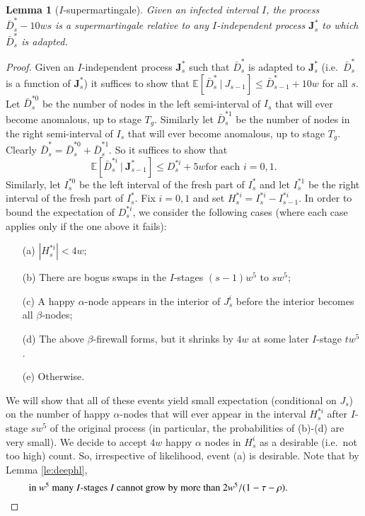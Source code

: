 \documentclass[11pt]{article}
\theoremstyle{plain}
\newtheorem{lem}[thm]{Lemma}
\numberwithin{equation}{subsection}
\newcommand{\JJ}{\mathbf{J}}
\DeclareRobustCommand{\expec}[3][{\mbox{$\mathbb{E}$}}]{\ensuremath {#1}\left[ {#2} \ \big|\  {#3} \right]}
\begin{document}
\begin{lem}[$I$-supermartingale]\label{le:atomdma}
Given an infected interval $I$, the process
$\bar{D}_{s}^{\ast}-10ws$ is a supermartingale
relative to any $I$-independent process $\JJ^{\ast}_s$ to which  $\bar{D}_{s}^{\ast}$ is adapted.
\end{lem}
\begin{proof}
Given an $I$-independent process $\JJ^{\ast}_s$ such that 
$\bar{D}_{s}^{\ast}$ is adapted to $\JJ^{\ast}_s$
(i.e.\ $\bar{D}_{s}^{\ast}$ is a function of $\JJ^{\ast}_s$) 
it suffices to show that $\expec{\bar{D}_{s}^{\ast}}{J_{s-1}}\leq \bar{D}_{s-1}^{\ast} +10w$
for all $s$.
Let $\bar{D}_{s}^{\ast 0}$ be the number of nodes in the left semi-interval of $I_s$ 
that will ever become anomalous, up to stage $T_g$. Similarly let
$\bar{D}_{s}^{\ast 1}$ be the number of nodes in the right semi-interval of $I_s$ 
that will ever become anomalous, up to stage $T_g$. Clearly 
$\bar{D}_{s}^{\ast}=\bar{D}_{s}^{\ast 0}+\bar{D}_{s}^{\ast 1}$. So it suffices to show that
\[
\textrm{$\expec{\bar{D}_{s}^{\ast i}}{\JJ^{\ast}_{s-1}}\leq D_{s}^{\ast i} +5w$
 for each $i=0,1$.}
\]
 Similarly, let $I^{\ast 0}_s$ be the left interval of the fresh part of $I_s^{\ast}$
 and let $I^{\ast 1}_s$ be the right interval of the fresh part of $I_s^{\ast}$.
 Fix $i=0,1$ and
 set $H^{\ast i}_{s}=I^{\ast i}_{s}-I^{\ast i}_{s-1}$.
In order to bound the expectation of $D^{\ast i}_s$, we consider the following cases 
(where each case applies only if the one above it fails):
\begin{enumerate}
\item[(a)] $|H^{\ast i}_{s}|< 4w$;
\item[(b)] There are  bogus swaps in the $I$-stages $(s-1)w^5$ to $sw^5$;
\item[(c)] A happy $\alpha$-node appears in the interior of $J^{i}_{s}$ before the interior becomes all
$\beta$-nodes;
\item[(d)] The above $\beta$-firewall forms, but it shrinks by $4w$ at some later $I$-stage $tw^5$.
\item[(e)] Otherwise.
\end{enumerate}
We will show that all of these events yield small expectation (conditional on  $J_s$) 
on the number of happy $\alpha$-nodes
that will ever appear in the  interval $H^{\ast i}_{s}$ 
after $I$-stage $sw^5$ of the original process (in particular, the probabilities of
(b)-(d) are very small). We decide to accept $4w$ happy $\alpha$ nodes in $H^{i}_{s}$ 
as a desirable (i.e.\ not too high)
count. So, irrespective of likelihood, event (a) is desirable. 
Note that by Lemma \ref{le:deephl},
\begin{equation}\label{eq:prob234o}
\parbox{11cm}{in $w^5$ many $I$-stages $I$ cannot grow by more than $2w^5/(1-\tau-\rho)$.}
\end{equation}


\end{proof}
\end{document}
